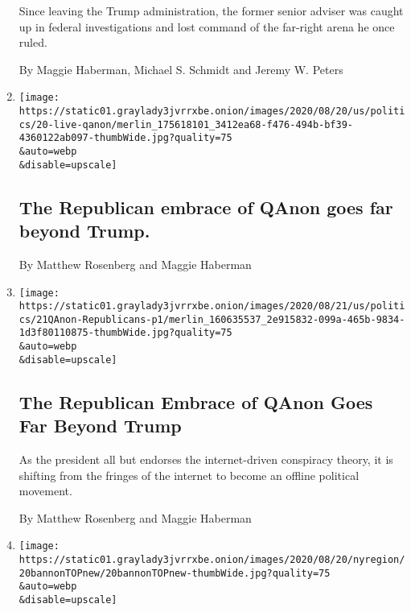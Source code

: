 \begin{enumerate}
  Since leaving the Trump administration, the former senior adviser was
  caught up in federal investigations and lost command of the far-right
  arena he once ruled.

  By Maggie Haberman, Michael S. Schmidt and Jeremy W. Peters
\item
  \href{/2020/08/20/us/elections/the-republican-embrace-of-qanon-goes-far-beyond-trump.html}{}

  \texttt{[image: https://static01.graylady3jvrrxbe.onion/images/2020/08/20/us/politics/20-live-qanon/merlin\_175618101\_3412ea68-f476-494b-bf39-4360122ab097-thumbWide.jpg?quality=75\\\&auto=webp\\\&disable=upscale]}

  \hypertarget{the-republican-embrace-of-qanon-goes-far-beyond-trump-1}{%
  \subsection{The Republican embrace of QAnon goes far beyond
  Trump.}\label{the-republican-embrace-of-qanon-goes-far-beyond-trump-1}}

  By Matthew Rosenberg and Maggie Haberman
\item
  \href{/2020/08/20/us/politics/qanon-trump-republicans.html}{}

  \texttt{[image: https://static01.graylady3jvrrxbe.onion/images/2020/08/21/us/politics/21QAnon-Republicans-p1/merlin\_160635537\_2e915832-099a-465b-9834-1d3f80110875-thumbWide.jpg?quality=75\\\&auto=webp\\\&disable=upscale]}

  \hypertarget{the-republican-embrace-of-qanon-goes-far-beyond-trump-2}{%
  \subsection{The Republican Embrace of QAnon Goes Far Beyond
  Trump}\label{the-republican-embrace-of-qanon-goes-far-beyond-trump-2}}

  As the president all but endorses the internet-driven conspiracy
  theory, it is shifting from the fringes of the internet to become an
  offline political movement.

  By Matthew Rosenberg and Maggie Haberman
\item
  \href{/2020/08/20/nyregion/steve-bannon-arrested-indicted.html}{}

  \texttt{[image: https://static01.graylady3jvrrxbe.onion/images/2020/08/20/nyregion/20bannonTOPnew/20bannonTOPnew-thumbWide.jpg?quality=75\\\&auto=webp\\\&disable=upscale]}

  \hypertarget{steve-bannon-is-charged-with-fraud-in-we-build-the-wall-campaign}{%
}
\end{enumerate}
